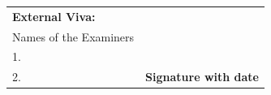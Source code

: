 \begin{titlepage}
\vspace{-0.3cm}
{\small
\begin{tabular}{p{7cm} p{7cm}}
\raggedright
\vspace{0.4cm}
\textbf{External Viva:}\\
Names of the Examiners\\
1. \\
2. 
&

\vspace{1.0cm}
\raggedleft
\textbf{Signature with date}\\

\end{tabular}
}



\end{titlepage}


